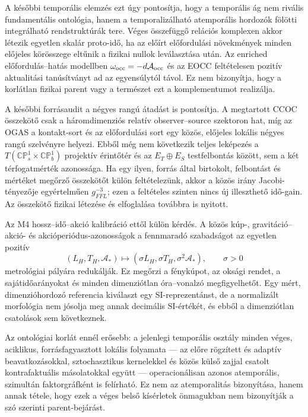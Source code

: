 \documentclass[12pt]{article}
\begin{document}
A későbbi temporális elemzés ezt úgy pontosítja, hogy a temporális ág nem
rivális fundamentális ontológia, hanem a temporalizálható atemporális hordozók
fölötti integrálható rendstruktúrák tere. Véges összefüggő relációs komplexen
akkor létezik egyetlen skalár proto-idő, ha az előírt előfordulási növekmények
minden előjeles körösszege eltűnik a fizikai nullok leválasztása után. Az
enriched előfordulás--hatás modellben
$\omega_{\rm occ}=-d\mathcal A_{\rm occ}$ és az EOCC feltételesen pozitív
aktualitási tanúsítványt ad az egyensúlytól távol. Ez nem bizonyítja, hogy a
korlátlan fizikai parent vagy a természet ezt a komplementumot realizálja.

A későbbi forrásaudit a négyes rangú átadást is pontosítja. A megtartott CCOC
összekötő csak a háromdimenziós relatív observer--source szektoron hat, míg az
OGAS a kontakt-sort és az előfordulási sort egy közös, előjeles lokális
négyes rangú szelvényre helyezi. Ebből még nem következik teljes leképezés a
$T(\mathbb{CP}^{1}_{s}\times\mathbb{CP}^{1}_{b})$ projektív érintőtér és az
$E_T\oplus E_S$ testfelbontás között, sem a két térfogatmérték azonossága. Ha
egy ilyen, forrás által birtokolt, felbontást és mértéket megőrző összekötőt
külön feltételezünk, akkor a közös irány Jacobi-tényezője egyértelműen
$g_{FFL}^{-3}$; ezen a feltételes szinten nincs új illeszthető idő-gain. Az
összekötő fizikai létezése és elfoglalása továbbra is nyitott.

Az M4 hossz--idő--akció kalibráció ettől külön kérdés. A közös kúp-,
gravitáció--akció- és akcióperiódus-azonosságok a fennmaradó szabadságot az
egyetlen pozitív
\[
 (L_H,T_H,\mathcal A_*)
 \longmapsto
 (\sigma L_H,\sigma T_H,\sigma^2\mathcal A_*),
 \qquad \sigma>0
\]
metrológiai pályára redukálják. Ez megőrzi a fénykúpot, az oksági rendet, a
sajátidőarányokat és minden dimenziótlan óra--vonalzó megfigyelhetőt. Egy
mért, dimenzióhordozó referencia kiválaszt egy SI-reprezentánst, de a
normalizált morfológia nem jósolja meg annak decimális SI-értékét, és ebből a
dimenziótlan csatolások sem következnek.

Az ontológiai korlát ennél erősebb: a jelenlegi temporális osztály minden
véges, aciklikus, forrásfagyasztott lokális folyamata --- az előre rögzített és
adaptív beavatkozásokkal, sztochasztikus kernelekkel és közös külső zajjal
csatolt kontrafaktuális másolatokkal együtt --- operacionálisan azonos
atemporális, szimultán faktorgráfként is felírható. Ez nem az atemporalitás
bizonyítása, hanem annak tétele, hogy ezek a véges belső kísérletek önmagukban
nem bizonyítják a szó szerinti parent-bejárást.
\end{document}
